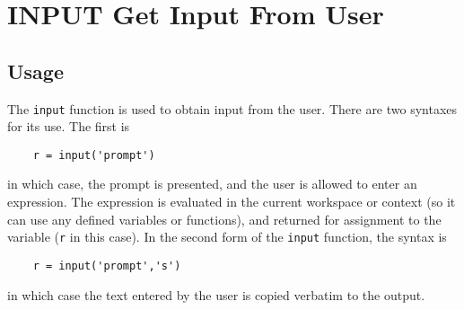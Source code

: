 \section{INPUT Get Input From User}

\subsection{Usage}

The \verb|input| function is used to obtain input from the user.  There are
two syntaxes for its use.  The first is
\begin{verbatim}
    r = input('prompt')
\end{verbatim}
in which case, the prompt is presented, and the user is allowed to enter
an expression.  The expression is evaluated in the current workspace or
context (so it can use any defined variables or functions), and returned
for assignment to the variable (\verb|r| in this case).  In the second form
of the \verb|input| function, the syntax is
\begin{verbatim}
    r = input('prompt','s')
\end{verbatim}
in which case the text entered by the user is copied verbatim to the
output.

